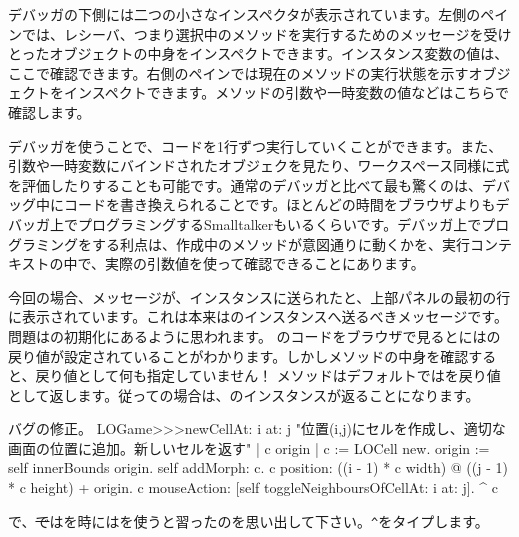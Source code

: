 \documentclass[a4paper,10pt,twoside]{book}
\begin{document}
デバッガの下側には二つの小さなインスペクタが表示されています。左側のペインでは、レシーバ、つまり選択中のメソッドを実行するためのメッセージを受けとったオブジェクトの中身をインスペクトできます。インスタンス変数の値は、ここで確認できます。右側のペインでは現在のメソッドの実行状態を示すオブジェクトをインスペクトできます。メソッドの引数や一時変数の値などはこちらで確認します。

デバッガを使うことで、コードを1行ずつ実行していくことができます。また、引数や一時変数にバインドされたオブジェクを見たり、ワークスペース同様に式を評価したりすることも可能です。通常のデバッガと比べて最も驚くのは、デバッグ中にコードを書き換えられることです。ほとんどの時間をブラウザよりもデバッガ上でプログラミングするSmalltalkerもいるくらいです。デバッガ上でプログラミングをする利点は、作成中のメソッドが意図通りに動くかを、実行コンテキストの中で、実際の引数値を使って確認できることにあります。

今回の場合、メッセージが、インスタンスに送られたと、上部パネルの最初の行に表示されています。これは本来はのインスタンスへ送るべきメッセージです。問題はの初期化にあるように思われます。
のコードをブラウザで見るとにはの戻り値が設定されていることがわかります。しかしメソッドの中身を確認すると、戻り値として何も指定していません！ メソッドはデフォルトではを戻り値として返します。従っての場合は、のインスタンスが返ることになります。

\dothis{デバッガウィンドウを閉じてください。
その後で、``\ct{^ c}''と \ct{LOGame>>>newCellAt:at:}メソッドの最後に追加して、\ct{c}を返すようにします。
(\mthref{newCellAt:at:nobug}参照。)}

\begin{method}{バグの修正。}
LOGame>>>newCellAt: i at: j
   "位置(i,j)にセルを作成し、適切な画面の位置に追加。新しいセルを返す"
   | c origin |
   c := LOCell new.
   origin := self innerBounds origin.
   self addMorph: c.
   c position: ((i - 1) * c width) @ ((j - 1) * c height) + origin.
   c mouseAction: [self toggleNeighboursOfCellAt: i at: j].
   ^ c
\end{method}

\noindent
{}で、\st ではを時には\ct{^}を使うと習ったのを思い出して下さい。\verb|^|をタイプします。
\end{document}
